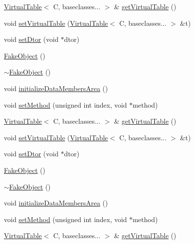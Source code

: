 \begin{DoxyCompactItemize}
\mbox{\hyperlink{structfakeit_1_1VirtualTable}{Virtual\+Table}}$<$ C, baseclasses... $>$ \& \mbox{\hyperlink{classfakeit_1_1FakeObject_a28a2c51a5eebcb098d63cc0e4afd2a35}{get\+Virtual\+Table}} ()
\item 
void \mbox{\hyperlink{classfakeit_1_1FakeObject_a541dcdf0dd88facbf2025790c41c1964}{set\+Virtual\+Table}} (\mbox{\hyperlink{structfakeit_1_1VirtualTable}{Virtual\+Table}}$<$ C, baseclasses... $>$ \&t)
\item 
void \mbox{\hyperlink{classfakeit_1_1FakeObject_a8045605042e0351da1e5d81288ae46ec}{set\+Dtor}} (void $\ast$dtor)
\item 
\mbox{\hyperlink{classfakeit_1_1FakeObject_ad705c5388b4354d1fdeef0bdd0151167}{Fake\+Object}} ()
\item 
\mbox{\hyperlink{classfakeit_1_1FakeObject_abfc9604c62598655fdefcc98a329dbbf}{$\sim$\+Fake\+Object}} ()
\item 
void \mbox{\hyperlink{classfakeit_1_1FakeObject_a894a7e1ef1e41cec0eb91cbb3d5c73cd}{initialize\+Data\+Members\+Area}} ()
\item 
void \mbox{\hyperlink{classfakeit_1_1FakeObject_ad05ea03dec6dc302d6d7b62e47bd1219}{set\+Method}} (unsigned int index, void $\ast$method)
\item 
\mbox{\hyperlink{structfakeit_1_1VirtualTable}{Virtual\+Table}}$<$ C, baseclasses... $>$ \& \mbox{\hyperlink{classfakeit_1_1FakeObject_a28a2c51a5eebcb098d63cc0e4afd2a35}{get\+Virtual\+Table}} ()
\item 
void \mbox{\hyperlink{classfakeit_1_1FakeObject_a541dcdf0dd88facbf2025790c41c1964}{set\+Virtual\+Table}} (\mbox{\hyperlink{structfakeit_1_1VirtualTable}{Virtual\+Table}}$<$ C, baseclasses... $>$ \&t)
\item 
void \mbox{\hyperlink{classfakeit_1_1FakeObject_a8045605042e0351da1e5d81288ae46ec}{set\+Dtor}} (void $\ast$dtor)
\item 
\mbox{\hyperlink{classfakeit_1_1FakeObject_ad705c5388b4354d1fdeef0bdd0151167}{Fake\+Object}} ()
\item 
\mbox{\hyperlink{classfakeit_1_1FakeObject_abfc9604c62598655fdefcc98a329dbbf}{$\sim$\+Fake\+Object}} ()
\item 
void \mbox{\hyperlink{classfakeit_1_1FakeObject_a894a7e1ef1e41cec0eb91cbb3d5c73cd}{initialize\+Data\+Members\+Area}} ()
\item 
void \mbox{\hyperlink{classfakeit_1_1FakeObject_ad05ea03dec6dc302d6d7b62e47bd1219}{set\+Method}} (unsigned int index, void $\ast$method)
\item 
\mbox{\hyperlink{structfakeit_1_1VirtualTable}{Virtual\+Table}}$<$ C, baseclasses... $>$ \& \mbox{\hyperlink{classfakeit_1_1FakeObject_a28a2c51a5eebcb098d63cc0e4afd2a35}{get\+Virtual\+Table}} ()

\end{DoxyCompactItemize}
